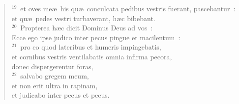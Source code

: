 \begin{flushleft}
\begin{verse}
${}^{19}$~et oves me\ae\ his qu\ae\ conculcata pedibus vestris fuerant, pascebantur~:\\ et qu\ae\ pedes vestri turbaverant, h\ae c bibebant.\\
${}^{20}$~Propterea h\ae c dicit Dominus Deus ad vos~:\\ Ecce ego ipse judico inter pecus pingue et macilentum~:\\
${}^{21}$~pro eo quod lateribus et humeris impingebatis,\\ et cornibus vestris ventilabatis omnia infirma pecora,\\ donec dispergerentur foras,\\
${}^{22}$~salvabo gregem meum,\\ et non erit ultra in rapinam,\\ et judicabo inter pecus et pecus.\end{verse}\end{flushleft}


